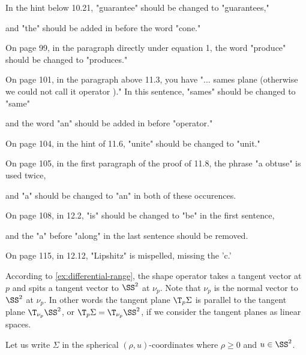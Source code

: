  In the hint below 10.21, "guarantee" should be changed to "guarantees," 
 
 and "the" should be added in before the word "cone." 
 
 On page 99, in the paragraph directly under equation 1,  the word "produce" should be changed to "produces." 
 
 On page 101, in the paragraph above 11.3, you have "... sames plane (otherwise we could not call it operator )." In this sentence, "sames" should be changed to "same" 
 
 and the word "an" should be added in before "operator." 
 
 On page 104, in the hint of 11.6, "unite" should be changed to "unit." 
 
 On page 105, in the first paragraph of the proof of 11.8, the phrase "a obtuse" is used twice, 
 
 and "a" should be changed to "an" in both of these occurences. 
 
 On page 108, in 12.2, "is" should be changed to "be" in the first sentence, 
 
 and the "a" before "along" in the last sentence should be removed. 
 
 On page 115, in 12.12, "Lipshitz" is mispelled, missing the 'c.'






















According to \ref{ex:differential-range}, the shape operator takes a tangent vector at $p$ and spits a tangent vector to $\SS^2$ at $\nu_p$.
Note that $\nu_p$ is the normal vector to $\SS^2$ at $\nu_p$.
In other words the tangent plane $\T_p\Sigma$ is parallel to the tangent plane $\T_{\nu_p}\SS^2$,
or $\T_p\Sigma=\T_{\nu_p}\SS^2$, if we consider the tangent planes as linear spaces. 












Let us write $\Sigma$ in the spherical $(\rho,u)$-coordinates where $\rho\ge 0$ and $u\in\SS^2$.



